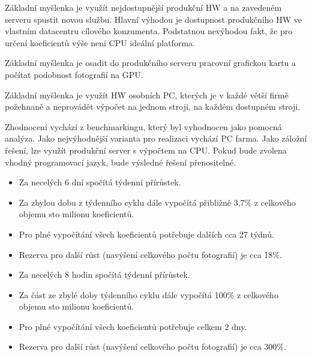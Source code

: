 Základní myšlenka je využít nejdostupnější produkční HW a na zavedeném serveru spustit novou službu. Hlavní výhodou je dostupnost produkčního HW ve vlastním datacentru cílového konzumenta. Podstatnou nevýhodou fakt, že pro určení koeficientů výše není CPU ideální platforma.

Základní myšlenka je osadit do produkčního serveru pracovní grafickou kartu a počítat podobnost fotografií na GPU.

Základní myšlenka je využít HW osobních PC, kterých je v každé větší firmě požehnaně a neprovádět výpočet na jednom stroji, na každém dostupném stroji.

Zhodnocení vychází z benchmarkingu, který byl vyhodnocen jako pomocná analýza. Jako nejvýhodnější varianta pro realizaci vychází PC farma. Jako záložní řešení, lze využít produkční server s výpočtem na CPU. Pokud bude zvolena vhodný programovací jazyk, bude výsledné řešení přenositelné.

\begin{itemize}
	\setlength{\parskip}{0pt}
	\setlength{\itemsep}{0pt}
	\item {Za necelých 6 dní spočítá týdenní přírůstek.}
	\item {Za zbylou dobu z týdenního cyklu dále vypočítá přibližně 3,7\% z celkového objemu sto milionu koeficientů.}
	\item {Pro plné vypočítání všech koeficientů potřebuje dalších cca 27 týdnů.}
	\item {Rezerva pro další růst (navýšení celkového počtu fotografií) je cca 18\%.}
\end{itemize}

\begin{itemize}
	\setlength{\parskip}{0pt}
	\setlength{\itemsep}{0pt}
	\item {Za necelých 8 hodin spočítá týdenní přírůstek.}
	\item {Za část ze zbylé doby týdenního cyklu dále vypočítá 100\% z celkového objemu sto milionu koeficientů.}
	\item {Pro plné vypočítání všech koeficientů potřebuje celkem 2 dny.}
	\item {Rezerva pro další růst (navýšení celkového počtu fotografií) je cca 300\%.}
\end{itemize}

